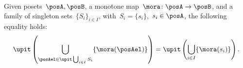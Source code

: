 \begin{lemma}
    \label{lem:unpack_u_functor}
    Given posets~$\posA,\posB$, a monotone map~$\mora \colon \posA \to \posB$, and a family of singleton sets~$\{S_i\}_{i\in I}$, with~$S_i=\{s_i\}$,~$s_i\in \posA$, the following equality holds:
    \begin{equation}
        \label{eq:lemma_unpack}
        \upit \left( \bigcup_{\posAel \in \upit \bigcup_{i\in I}S_i}\{\mora(\posAel)\}\right)= \upit \left( \bigcup_{i\in I} \{\mora(s_i)\}\right).
    \end{equation}
\end{lemma}



